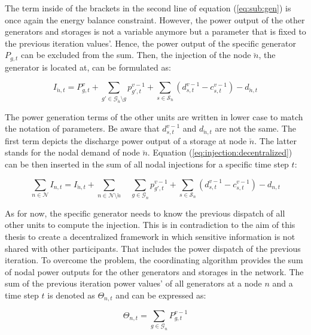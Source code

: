 The term inside of the brackets in the second line of equation (\ref{eq:sub:gen}) is once again the energy balance constraint. However, the power output of the other generators and storages is not a variable anymore but a parameter that is fixed to the previous iteration values'. Hence, the power output of the specific generator $P_{g,t}$ can be excluded from the sum. Then, the injection of the node $\breve{n}$, the generator is located at, can be formulated as:
 
 \begin{equation}
	I_{\breve{n},t} = P_{g,t}^v + \sum_{g'\in\mathcal{G}_{\breve{n}} \setminus g}p_{g',t}^{v-1} + \sum_{s\in\mathcal{S}_{\breve{n}}}(d_{s,t}^{v-1}-c_{s,t}^{v-1})-d_{\breve{n},t}
	\label{eq:injection:decentralized}
\end{equation} 
 
 The power generation terms of the other units are written in lower case to match the notation of parameters. Be aware that $d_{s,t}^{v-1}$ and $d_{\breve{n},t}$ are not the same. The first term depicts the discharge power output of a storage at node $\breve{n}$. The latter stands for the nodal demand of node $\breve{n}$. Equation (\ref{eq:injection:decentralized}) can be then inserted in the sum of all nodal injections for a specific time step $t$:
 
 \begin{equation}
 	\sum_{n \in \mathcal{N}} I_{n,t} = I_{\breve{n},t} + \sum_{n \in \mathcal{N} \setminus \breve{n}} \quad \sum_{g\in\mathcal{G}_n}p_{g',t}^{v-1} + \sum_{s\in\mathcal{S}_n}(d_{s,t}^{v-1}-c_{s,t}^{v-1})-d_{n,t}
 \end{equation}
 
 As for now, the specific generator needs to know the previous dispatch of all other units to compute the injection. This is in contradiction to the aim of this thesis to create a decentralized framework in which sensitive information is not shared with other participants. That includes the power dispatch of the previous iteration. To overcome the problem, the coordinating algorithm provides the sum of nodal power outputs for the other generators and storages in the network. The sum of the previous iteration power values' of all generators at a node $n$ and a time step $t$ is denoted as $\Theta_{n,t}$ and can be expressed as:
 
 \begin{equation}
 	\Theta_{n,t} = \sum_{g\in\mathcal{G}_{n}}P_{g,t}^{v-1}
 \end{equation}
 
